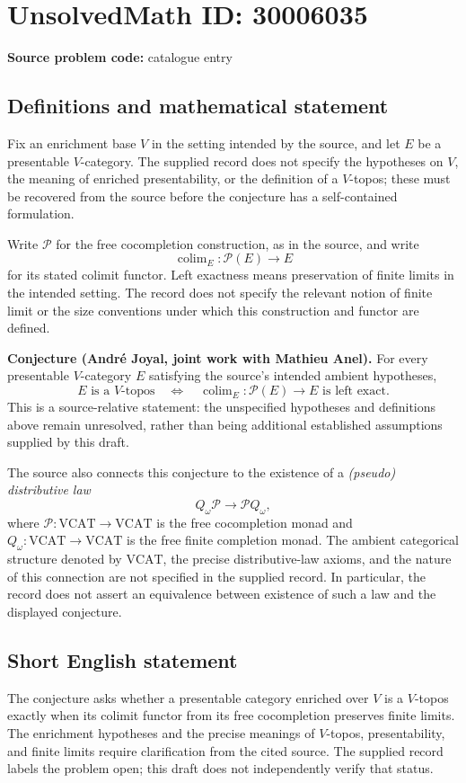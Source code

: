 \documentclass[11pt]{article}
\begin{document}
\section*{UnsolvedMath ID: 30006035}
\textbf{Source problem code:} catalogue entry
\subsection{Definitions and mathematical statement}
Fix an enrichment base \(V\) in the setting intended by the source, and let \(E\) be a presentable \(V\)-category. The supplied record does not specify the hypotheses on \(V\), the meaning of enriched presentability, or the definition of a \(V\)-topos; these must be recovered from the source before the conjecture has a self-contained formulation.

Write \(\mathcal{P}\) for the free cocompletion construction, as in the source, and write
\[
\operatorname{colim}_E\colon \mathcal{P}(E)\longrightarrow E
\]
for its stated colimit functor. Left exactness means preservation of finite limits in the intended setting. The record does not specify the relevant notion of finite limit or the size conventions under which this construction and functor are defined.

\textbf{Conjecture (Andr\'e Joyal, joint work with Mathieu Anel).} For every presentable \(V\)-category \(E\) satisfying the source's intended ambient hypotheses,
\[
E\text{ is a }V\text{-topos}
\quad\Longleftrightarrow\quad
\operatorname{colim}_E\colon\mathcal{P}(E)\longrightarrow E
\text{ is left exact}.
\]
This is a source-relative statement: the unspecified hypotheses and definitions above remain unresolved, rather than being additional established assumptions supplied by this draft.

The source also connects this conjecture to the existence of a \emph{(pseudo) distributive law}
\[
Q_{\omega}\mathcal{P}\longrightarrow\mathcal{P}Q_{\omega},
\]
where \(\mathcal{P}\colon\mathrm{VCAT}\to\mathrm{VCAT}\) is the free cocompletion monad and \(Q_{\omega}\colon\mathrm{VCAT}\to\mathrm{VCAT}\) is the free finite completion monad. The ambient categorical structure denoted by \(\mathrm{VCAT}\), the precise distributive-law axioms, and the nature of this connection are not specified in the supplied record. In particular, the record does not assert an equivalence between existence of such a law and the displayed conjecture.
\subsection{Short English statement}
The conjecture asks whether a presentable category enriched over \(V\) is a \(V\)-topos exactly when its colimit functor from its free cocompletion preserves finite limits. The enrichment hypotheses and the precise meanings of \(V\)-topos, presentability, and finite limits require clarification from the cited source. The supplied record labels the problem open; this draft does not independently verify that status.
\end{document}

